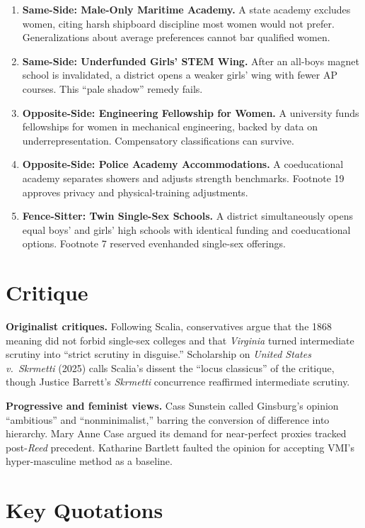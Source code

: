 \documentclass[12pt]{article}
\begin{document}
\begin{enumerate}
\item \textbf{Same-Side: Male-Only Maritime Academy.} A state academy excludes women, citing harsh shipboard discipline most women would not prefer. Generalizations about average preferences cannot bar qualified women.
\item \textbf{Same-Side: Underfunded Girls' STEM Wing.} After an all-boys magnet school is invalidated, a district opens a weaker girls' wing with fewer AP courses. This ``pale shadow'' remedy fails.
\item \textbf{Opposite-Side: Engineering Fellowship for Women.} A university funds fellowships for women in mechanical engineering, backed by data on underrepresentation. Compensatory classifications can survive.
\item \textbf{Opposite-Side: Police Academy Accommodations.} A coeducational academy separates showers and adjusts strength benchmarks. Footnote 19 approves privacy and physical-training adjustments.
\item \textbf{Fence-Sitter: Twin Single-Sex Schools.} A district simultaneously opens equal boys' and girls' high schools with identical funding and coeducational options. Footnote 7 reserved evenhanded single-sex offerings.
\end{enumerate}

\section{Critique}

\textbf{Originalist critiques.} Following Scalia, conservatives argue that the 1868 meaning did not forbid single-sex colleges and that \textit{Virginia} turned intermediate scrutiny into ``strict scrutiny in disguise.'' Scholarship on \textit{United States v.\ Skrmetti} (2025) calls Scalia's dissent the ``locus classicus'' of the critique, though Justice Barrett's \textit{Skrmetti} concurrence reaffirmed intermediate scrutiny.

\textbf{Progressive and feminist views.} Cass Sunstein called Ginsburg's opinion ``ambitious'' and ``nonminimalist,'' barring the conversion of difference into hierarchy. Mary Anne Case argued its demand for near-perfect proxies tracked post-\textit{Reed} precedent. Katharine Bartlett faulted the opinion for accepting VMI's hyper-masculine method as a baseline.

\section{Key Quotations}
\end{document}

